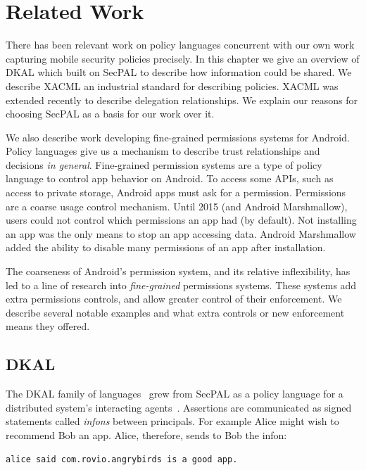 \documentclass[thesis.tex]{subfiles}
\begin{document}
\chapter{Related Work}
\label{chap:related-work}
   
There has been relevant work on policy languages concurrent with our own work
capturing mobile security policies precisely. In this chapter we give an
overview of DKAL which built on SecPAL to describe how information could be
shared. We describe XACML an industrial standard for describing policies.
XACML was extended recently to describe delegation relationships. We explain
our reasons for choosing SecPAL as a basis for our work over it.

We also describe work developing fine-grained permissions systems for Android.
Policy languages give us a mechanism to describe trust relationships and
decisions \emph{in general}. Fine-grained permission systems are a type of
policy language to control app behavior on Android. To access some APIs, such as
access to private storage, Android apps must ask for a permission. Permissions
are a coarse usage control mechanism. Until 2015 (and Android Marshmallow),
users could not control which permissions an app had (by default).
Not installing an app was the only means to stop an app accessing data.
Android Marshmallow added the ability to disable many permissions of
an app after installation.

The coarseness of Android's permission system, and its relative inflexibility,
has led to a line of research into \emph{fine-grained} permissions systems.
These systems add extra permissions controls, and allow greater control of their
enforcement. We describe several notable examples and what extra controls
or new enforcement means they offered.

\section{DKAL}

The DKAL family of
languages~\cite{jeannin_dkal*:_2013,gurevich_dkal:_2008,yuri_gurevich_dkal2---simplified_2009}
grew from SecPAL as a policy language for a distributed
system's interacting agents~\cite{blass_introduction_2012}. Assertions are
communicated as signed statements called \emph{infons} between principals. For
example Alice might wish to recommend Bob an app. Alice, therefore, sends to Bob
the infon:

\begin{lstlisting}
alice said com.rovio.angrybirds is a good app.
\end{lstlisting}
\end{document}
